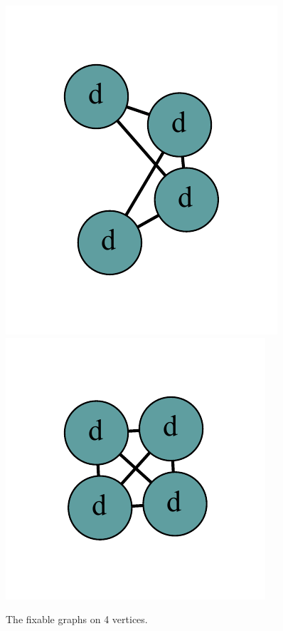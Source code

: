 \documentclass[12pt]{article}
\theoremstyle{plain}
\theoremstyle{definition}
\theoremstyle{remark}
\begin{document}
\begin{figure}[htb]
			\includegraphics[scale=0.5]{Superabundance/all/011111[2,2,3,3].pdf}
			\includegraphics[scale=0.5]{Superabundance/all/111111[3,3,3,3].pdf}
			\caption{The fixable graphs on 4 vertices.}
			\label{fig:fixable4}
		\end{figure}
\end{document}
